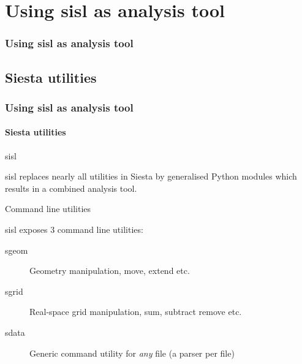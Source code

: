 
\section{Using sisl as analysis tool}

\begin{frame}
  \frametitle{Using sisl as analysis tool}
  \tableofcontents[currentsection]
\end{frame}

\subsection{Siesta utilities}

\begin{frame}
  \frametitle{Using sisl as analysis tool}
  \framesubtitle{Siesta utilities}

  \begin{block}{sisl}

    sisl replaces nearly all utilities in Siesta by generalised Python
    modules which results in a combined analysis tool.
    
  \end{block}

  \begin{block}{Command line utilities}

    sisl exposes 3 command line utilities:

    \begin{description}
      \item[sgeom] Geometry manipulation, move, extend etc.

      \item[sgrid] Real-space grid manipulation, sum, subtract remove etc.

      \item[sdata] Generic command utility for \emph{any} file (a parser per file)

    \end{description}

  \end{block}
  

\end{frame}
